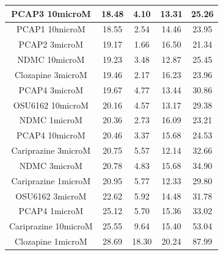 \documentclass[a4paper,12pt]{article}
\begin{document}
\begin{table}[h!]
\begin{tabular}{|c|c|c|c|c|}
PCAP3 10microM      & 18.48 & 4.10  & 13.31 & 25.26 \\ \hline
PCAP1 10microM        & 18.55 & 2.54 & 14.46 & 23.95 \\ \hline
PCAP2 3microM         & 19.17 & 1.66 & 16.50  & 21.34 \\ \hline
NDMC 10microM         & 19.23 & 3.48 & 12.87 & 25.45 \\ \hline
Clozapine 3microM     & 19.46 & 2.17 & 16.23 & 23.96 \\ \hline
PCAP4 3microM       & 19.67 & 4.77 & 13.44 & 30.86 \\ \hline
OSU6162 10microM      & 20.16 & 4.57 & 13.17 & 29.38 \\ \hline
NDMC 1microM          & 20.36 & 2.73 & 16.09 & 23.21 \\ \hline
PCAP4 10microM      & 20.46 & 3.37 & 15.68 & 24.53 \\ \hline
Cariprazine 3microM   & 20.75 & 5.57 & 12.14 & 32.66 \\ \hline
NDMC 3microM          & 20.78 & 4.83 & 15.68 & 34.90  \\ \hline
Cariprazine 1microM   & 20.95 & 5.77 & 12.33 & 29.80  \\ \hline
OSU6162 3microM       & 22.62 & 5.92 & 14.48 & 31.78 \\ \hline
PCAP4 1microM       & 25.12 & 5.70  & 15.36 & 33.02 \\ \hline
Cariprazine 10microM  & 25.55 & 9.64 & 15.40  & 53.04 \\ \hline
Clozapine 1microM     & 28.69 & 18.30 & 20.24 & 87.99 \\\hline
\end{tabular} 
\end{table}
\newpage
\end{document}
